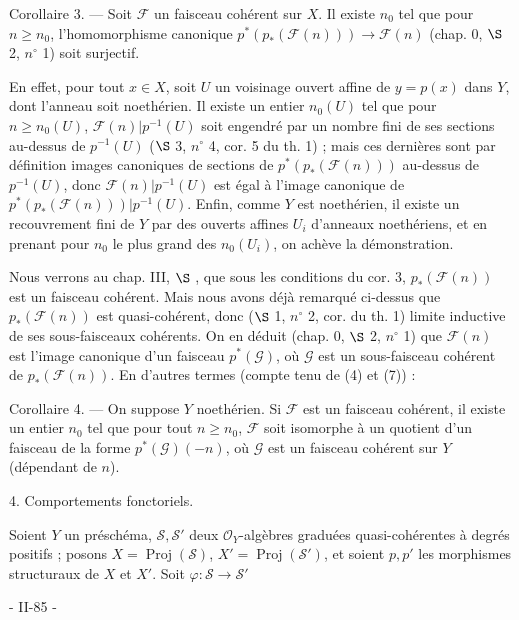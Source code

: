 Corollaire 3. — Soit $\mathcal{F}$ un faisceau cohérent sur $X$. Il existe $n_0$ tel que pour $n \geq n_0$, l'homomorphisme canonique $p^*(p_*(\mathcal{F}(n))) \to \mathcal{F}(n)$ (chap. 0, $\S$ 2, $n^\circ$ 1) soit surjectif.

En effet, pour tout $x \in X$, soit $U$ un voisinage ouvert affine de $y=p(x)$ dans $Y$, dont l'anneau soit noethérien. Il existe un entier $n_0(U)$ tel que pour $n \geq n_0(U)$, $\mathcal{F}(n)|p^{-1}(U)$ soit engendré par un nombre fini de ses sections au-dessus de $p^{-1}(U)$ ($\S$ 3, $n^\circ$ 4, cor. 5 du th. 1) ; mais ces dernières sont par définition images canoniques de sections de $p^*(p_*(\mathcal{F}(n)))$ au-dessus de $p^{-1}(U)$, donc $\mathcal{F}(n)|p^{-1}(U)$ est égal à l'image canonique de $p^*(p_*(\mathcal{F}(n)))|p^{-1}(U)$. Enfin, comme $Y$ est noethérien, il existe un recouvrement fini de $Y$ par des ouverts affines $U_i$ d'anneaux noethériens, et en prenant pour $n_0$ le plus grand des $n_0(U_i)$, on achève la démonstration.

Nous verrons au chap. III, $\S$ , que sous les conditions du cor. 3, $p_*(\mathcal{F}(n))$ est un faisceau cohérent. Mais nous avons déjà remarqué ci-dessus que $p_*(\mathcal{F}(n))$ est quasi-cohérent, donc ($\S$ 1, $n^\circ$ 2, cor. du th. 1) limite inductive de ses sous-faisceaux cohérents. On en déduit (chap. 0, $\S$ 2, $n^\circ$ 1) que $\mathcal{F}(n)$ est l'image canonique d'un faisceau $p^*(\mathcal{G})$, où $\mathcal{G}$ est un sous-faisceau cohérent de $p_*(\mathcal{F}(n))$. En d'autres termes (compte tenu de (4) et (7)) :

Corollaire 4. — On suppose $Y$ noethérien. Si $\mathcal{F}$ est un faisceau cohérent, il existe un entier $n_0$ tel que pour tout $n \geq n_0$, $\mathcal{F}$ soit isomorphe à un quotient d'un faisceau de la forme $p^*(\mathcal{G})(-n)$, où $\mathcal{G}$ est un faisceau cohérent sur $Y$ (dépendant de $n$).

4. Comportements fonctoriels.

Soient $Y$ un préschéma, $\mathcal{S}, \mathcal{S}'$ deux $\mathcal{O}_Y$-algèbres graduées quasi-cohérentes à degrés positifs ; posons $X = \operatorname{Proj}(\mathcal{S})$, $X' = \operatorname{Proj}(\mathcal{S}')$, et soient $p, p'$ les morphismes structuraux de $X$ et $X'$. Soit $\varphi : \mathcal{S} \to \mathcal{S}'$

\newpage


- II-85 -

